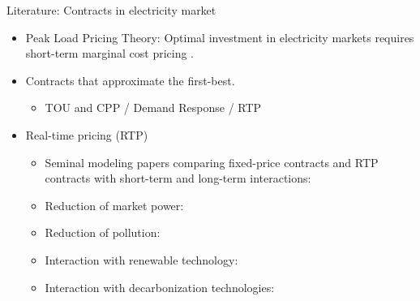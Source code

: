 \documentclass{class}
\begin{document}



\begin{frame}{Literature: Contracts in electricity market}\label{Lit_FB}

\begin{itemize}
    \item Peak Load Pricing Theory: Optimal investment in electricity markets requires short-term marginal cost pricing \cite{m1949tarification,joskow2007reliability}. \vfill

\item Contracts that approximate the first-best.
    \begin{itemize}
        \item  TOU and CPP / Demand Response / RTP \cite{Hinchberger2024}
    \end{itemize}

    \vfill

\item Real-time pricing (RTP)
    \begin{itemize}
        \item Seminal modeling papers comparing fixed-price contracts and RTP contracts with short-term and long-term interactions: \cite{Borenstein2003,Borenstein2005a,Borenstein2005b}
        \item Reduction of market power: \cite{Poletti2020}
        \item Reduction of pollution: \cite{Borenstein2021} 
        \item Interaction with renewable technology: \cite{Imelda2024}
        \item Interaction with decarbonization technologies: \cite{bailey2024electric}
    \end{itemize}
\end{itemize}

    \vfill
    
 \hyperlink{Motivations}{}
    
\end{frame}
\end{document}
